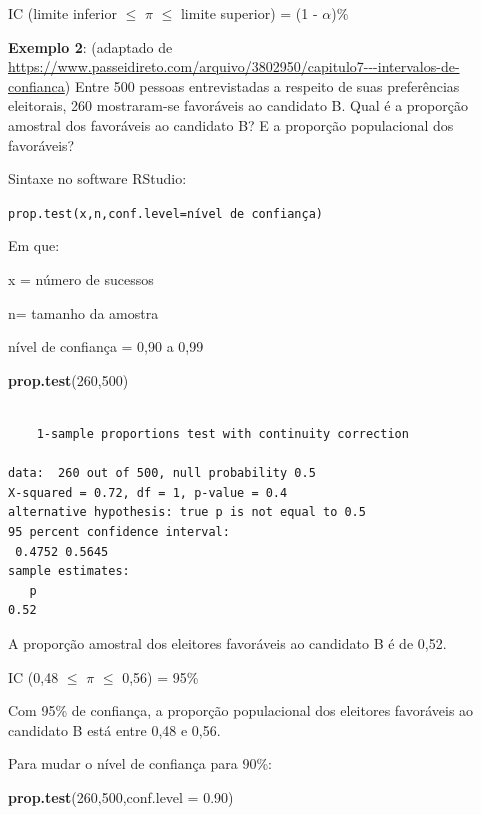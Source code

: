 \documentclass[12pt,portuguese,oneside]{book}
\newenvironment{Shaded}{\begin{snugshade}}{\end{snugshade}}
\newcommand{\KeywordTok}[1]{\textcolor[rgb]{0.13,0.29,0.53}{\textbf{#1}}}
\newcommand{\DataTypeTok}[1]{\textcolor[rgb]{0.13,0.29,0.53}{#1}}
\newcommand{\DecValTok}[1]{\textcolor[rgb]{0.00,0.00,0.81}{#1}}
\newcommand{\FloatTok}[1]{\textcolor[rgb]{0.00,0.00,0.81}{#1}}
\newcommand{\NormalTok}[1]{#1}
\begin{document}
IC (limite inferior \(\leq\) \(\pi\) \(\leq\) limite superior) = (1 -
\(\alpha\))\%

\textbf{Exemplo 2}: (adaptado de
\url{https://www.passeidireto.com/arquivo/3802950/capitulo7---intervalos-de-confianca})
Entre 500 pessoas entrevistadas a respeito de suas preferências
eleitorais, 260 mostraram-se favoráveis ao candidato B. Qual é a
proporção amostral dos favoráveis ao candidato B? E a proporção
populacional dos favoráveis?

Sintaxe no software RStudio:

\texttt{prop.test(x,n,conf.level=nível\ de\ confiança)}

Em que:

x = número de sucessos

n= tamanho da amostra

nível de confiança = 0,90 a 0,99

\begin{Shaded}
\begin{Highlighting}[]
\KeywordTok{prop.test}\NormalTok{(}\DecValTok{260}\NormalTok{,}\DecValTok{500}\NormalTok{)}
\end{Highlighting}
\end{Shaded}

\begin{verbatim}

    1-sample proportions test with continuity correction

data:  260 out of 500, null probability 0.5
X-squared = 0.72, df = 1, p-value = 0.4
alternative hypothesis: true p is not equal to 0.5
95 percent confidence interval:
 0.4752 0.5645
sample estimates:
   p 
0.52 
\end{verbatim}

A proporção amostral dos eleitores favoráveis ao candidato B é de 0,52.

IC (0,48 \(\leq\) \(\pi\) \(\leq\) 0,56) = 95\%

Com 95\% de confiança, a proporção populacional dos eleitores favoráveis
ao candidato B está entre 0,48 e 0,56.

Para mudar o nível de confiança para 90\%:

\begin{Shaded}
\begin{Highlighting}[]
\KeywordTok{prop.test}\NormalTok{(}\DecValTok{260}\NormalTok{,}\DecValTok{500}\NormalTok{,}\DataTypeTok{conf.level =} \FloatTok{0.90}\NormalTok{)}
\end{Highlighting}
\end{Shaded}
\end{document}
